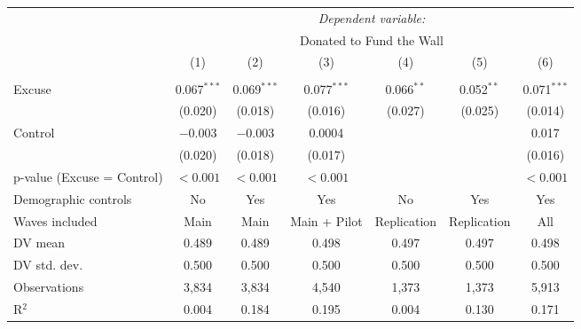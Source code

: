 
\begin{table}[!htbp] \centering 
  \label{t:2-main} 
\begin{threeparttable}
\begin{tabular}{@{\hspace{5pt}}l@{\hspace{5pt}}cccccc} 
\toprule 
 & \multicolumn{6}{c}{\textit{Dependent variable:}} \\ 
\cmidrule(rr){2-7} 
 & \multicolumn{6}{c}{Donated to Fund the Wall} \\ 
 \cmidrule(rr){2-7}
 & (1) & (2) & (3) & (4) & (5) & (6)\\ 
\midrule  
\\[-2.1ex] Excuse & 0.067$^{***}$ & 0.069$^{***}$ & 0.077$^{***}$ & 0.066$^{**}$ & 0.052$^{**}$ & 0.071$^{***}$ \\ 
  & (0.020) & (0.018) & (0.016) & (0.027) & (0.025) & (0.014) \\ 
 \addlinespace 
 Control & $-$0.003 & $-$0.003 & 0.0004 &  &  & 0.017 \\ 
  & (0.020) & (0.018) & (0.017) &  &  & (0.016) \\ 
 \addlinespace 
p-value (Excuse = Control) & $<0.001$ & $<0.001$ & $<0.001$ &  &  & $<0.001$ \\ 
\midrule  
Demographic controls & No & Yes & Yes & No & Yes & Yes \\ 
Waves included & Main & Main & Main + Pilot & Replication & Replication & All \\ 
\midrule
\addlinespace
DV mean & 0.489 & 0.489 & 0.498 & 0.497 & 0.497 & 0.498 \\
DV std. dev. & 0.500 & 0.500 & 0.500 & 0.500 & 0.500 & 0.500 \\
Observations & 3,834 & 3,834 & 4,540 & 1,373 & 1,373 & 5,913 \\ 
R$^{2}$ & 0.004 & 0.184 & 0.195 & 0.004 & 0.130 & 0.171 \\ 
\bottomrule 
\end{tabular} 
\end{threeparttable}
\end{table} 
